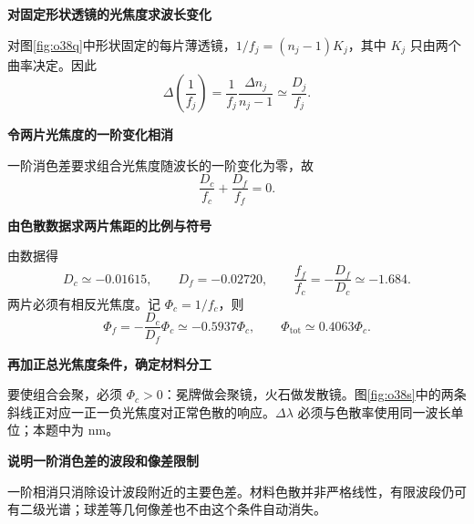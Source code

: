 \begin{solution}\textbf{对固定形状透镜的光焦度求波长变化}\par\nobreak
对图\ref{fig:o38q}中形状固定的每片薄透镜，\(1/f_j=(n_j-1)K_j\)，其中 \(K_j\) 只由两个曲率决定。因此
\[
 \Delta\!\left(\frac1{f_j}\right)
 =\frac1{f_j}\frac{\Delta n_j}{n_j-1}
 \simeq\frac{D_j}{f_j}.
\]


\par\medskip{}\noindent\textbf{令两片光焦度的一阶变化相消}\par\nobreak
一阶消色差要求组合光焦度随波长的一阶变化为零，故
\[
 \boxed{\frac{D_c}{f_c}+\frac{D_f}{f_f}=0}.
\]



\par\medskip{}\noindent\textbf{由色散数据求两片焦距的比例与符号}\par\nobreak
由数据得
\[
 D_c\simeq-0.01615,\qquad D_f=-0.02720,
 \qquad \frac{f_f}{f_c}=-\frac{D_f}{D_c}\simeq-1.684.
\]
两片必须有相反光焦度。记 \(\Phi_c=1/f_c\)，则
\[
 \Phi_f=-\frac{D_c}{D_f}\Phi_c\simeq-0.5937\Phi_c,
 \qquad \Phi_{\mathrm{tot}}\simeq0.4063\Phi_c.
\]


\par\medskip{}\noindent\textbf{再加正总光焦度条件，确定材料分工}\par\nobreak
要使组合会聚，必须 \(\Phi_c>0\)：\(\boxed{\text{冕牌做会聚镜，火石做发散镜}}\)。图\ref{fig:o38s}中的两条斜线正对应一正一负光焦度对正常色散的响应。\(\Delta\lambda\) 必须与色散率使用同一波长单位；本题中为 \(\mathrm{nm}\)。



\par\medskip{}\noindent\textbf{说明一阶消色差的波段和像差限制}\par\nobreak
一阶相消只消除设计波段附近的主要色差。材料色散并非严格线性，有限波段仍可有二级光谱；球差等几何像差也不由这个条件自动消失。
\end{solution}

